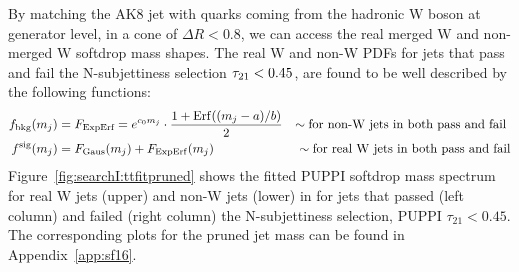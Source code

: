 By matching the AK8 jet with quarks coming from the hadronic W boson at generator level, in a cone of $\Delta R < 0.8$, we can access the real merged W and non-merged W softdrop mass shapes.
The real W and non-W PDFs for jets that pass and fail the N-subjettiness selection $\tau_{21} < 0.45$, are found to be well described by the following functions:
\begin{align*} 
f_{\rm bkg}(m_{j}) &= F_{\textrm{ExpErf}} = e^{c_0m_{j}} \cdot \frac{1 + {\rm Erf}((m_{j}-a)/b)}{2}  &\sim\textrm{for non-\PW jets in both pass and fail }\\
f^{\rm sig}(m_{j}) &= F_{\rm Gaus}(m_{j}) + F_{\rm ExpErf}(m_{j})                                    &\sim\textrm{for real \PW jets in both pass and fail}
\end{align*}
Figure~\ref{fig:searchI:ttfitpruned} shows the fitted PUPPI softdrop mass spectrum for real W jets (upper) and non-W jets (lower) in \ttbar for jets that passed (left column) and failed (right column) the N-subjettiness selection, PUPPI $\tau_{21}<0.45$. The corresponding plots for the pruned jet mass can be found in Appendix~\ref{app:sf16}.

